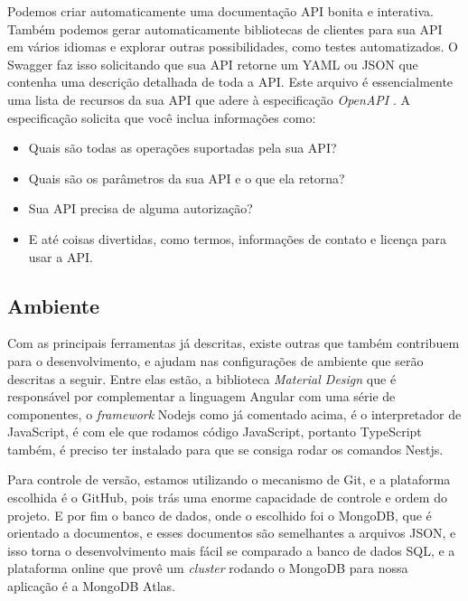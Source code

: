 Podemos criar automaticamente uma documentação API bonita e interativa. Também podemos gerar automaticamente bibliotecas de clientes para sua API em vários idiomas e explorar outras possibilidades, como testes automatizados. O Swagger faz isso solicitando que sua API retorne um YAML ou JSON que contenha uma descrição detalhada de toda a API. Este arquivo é essencialmente uma lista de recursos da sua API que adere à especificação \textit{OpenAPI} \cite{shockey2020Swagger}. A especificação solicita que você inclua informações como:

\begin{itemize}
    \item Quais são todas as operações suportadas pela sua API? 
    \item Quais são os parâmetros da sua API e o que ela retorna?   
    \item Sua API precisa de alguma autorização?
    \item E até coisas divertidas, como termos, informações de contato e licença para usar a API.
\end{itemize}

\subsection{Ambiente}
Com as principais ferramentas já descritas, existe outras que também contribuem para o desenvolvimento, e ajudam nas configurações de ambiente que serão descritas a seguir. Entre elas estão, a biblioteca \textit{Material Design} que é responsável por complementar a linguagem Angular com uma série de componentes, o \textit{framework} Nodejs como já comentado acima, é o interpretador de JavaScript, é com ele que rodamos código JavaScript, portanto TypeScript também, é preciso ter instalado para que se consiga rodar os comandos Nestjs. 

Para controle de versão, estamos utilizando o mecanismo de Git, e a plataforma escolhida é o GitHub, pois trás uma enorme capacidade de controle e ordem do projeto. E por fim o banco de dados, onde o escolhido foi o MongoDB, que é orientado a documentos, e esses documentos são semelhantes a arquivos JSON, e isso torna o desenvolvimento mais fácil se comparado a banco de dados SQL, e a plataforma online que provê um \textit{cluster} rodando o MongoDB para nossa aplicação é a MongoDB Atlas.


\
